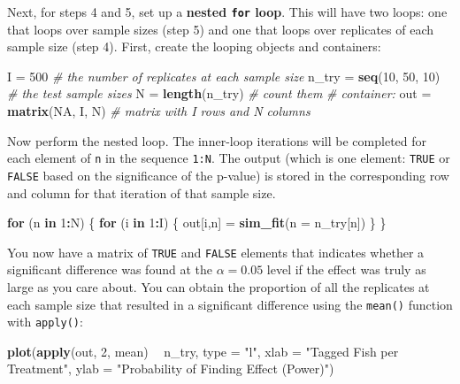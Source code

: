 \documentclass[]{book}
\newenvironment{Shaded}{\begin{snugshade}}{\end{snugshade}}
\newcommand{\KeywordTok}[1]{\textcolor[rgb]{0.13,0.29,0.53}{\textbf{#1}}}
\newcommand{\DataTypeTok}[1]{\textcolor[rgb]{0.13,0.29,0.53}{#1}}
\newcommand{\DecValTok}[1]{\textcolor[rgb]{0.00,0.00,0.81}{#1}}
\newcommand{\StringTok}[1]{\textcolor[rgb]{0.31,0.60,0.02}{#1}}
\newcommand{\CommentTok}[1]{\textcolor[rgb]{0.56,0.35,0.01}{\textit{#1}}}
\newcommand{\OtherTok}[1]{\textcolor[rgb]{0.56,0.35,0.01}{#1}}
\newcommand{\ControlFlowTok}[1]{\textcolor[rgb]{0.13,0.29,0.53}{\textbf{#1}}}
\newcommand{\OperatorTok}[1]{\textcolor[rgb]{0.81,0.36,0.00}{\textbf{#1}}}
\newcommand{\NormalTok}[1]{#1}
\theoremstyle{definition}
\theoremstyle{definition}
\theoremstyle{definition}
\theoremstyle{remark}
\begin{document}
Next, for steps 4 and 5, set up a \textbf{nested \texttt{for} loop}.
This will have two loops: one that loops over sample sizes (step 5) and
one that loops over replicates of each sample size (step 4). First,
create the looping objects and containers:

\begin{Shaded}
\begin{Highlighting}[]
\NormalTok{I =}\StringTok{ }\DecValTok{500}  \CommentTok{# the number of replicates at each sample size}
\NormalTok{n_try =}\StringTok{ }\KeywordTok{seq}\NormalTok{(}\DecValTok{10}\NormalTok{, }\DecValTok{50}\NormalTok{, }\DecValTok{10}\NormalTok{)  }\CommentTok{# the test sample sizes}
\NormalTok{N =}\StringTok{ }\KeywordTok{length}\NormalTok{(n_try)        }\CommentTok{# count them}
\CommentTok{# container: }
\NormalTok{out =}\StringTok{ }\KeywordTok{matrix}\NormalTok{(}\OtherTok{NA}\NormalTok{, I, N) }\CommentTok{# matrix with I rows and N columns}
\end{Highlighting}
\end{Shaded}

Now perform the nested loop. The inner-loop iterations will be completed
for each element of \texttt{n} in the sequence \texttt{1:N}. The output
(which is one element: \texttt{TRUE} or \texttt{FALSE} based on the
significance of the p-value) is stored in the corresponding row and
column for that iteration of that sample size.

\begin{Shaded}
\begin{Highlighting}[]
\ControlFlowTok{for}\NormalTok{ (n }\ControlFlowTok{in} \DecValTok{1}\OperatorTok{:}\NormalTok{N) \{}
  \ControlFlowTok{for}\NormalTok{ (i }\ControlFlowTok{in} \DecValTok{1}\OperatorTok{:}\NormalTok{I) \{}
\NormalTok{    out[i,n] =}\StringTok{ }\KeywordTok{sim_fit}\NormalTok{(}\DataTypeTok{n =}\NormalTok{ n_try[n])}
\NormalTok{  \}}
\NormalTok{\}}
\end{Highlighting}
\end{Shaded}

You now have a matrix of \texttt{TRUE} and \texttt{FALSE} elements that
indicates whether a significant difference was found at the
\(\alpha = 0.05\) level if the effect was truly as large as you care
about. You can obtain the proportion of all the replicates at each
sample size that resulted in a significant difference using the
\texttt{mean()} function with \texttt{apply()}:

\begin{Shaded}
\begin{Highlighting}[]
\KeywordTok{plot}\NormalTok{(}\KeywordTok{apply}\NormalTok{(out, }\DecValTok{2}\NormalTok{, mean) }\OperatorTok{~}\StringTok{ }\NormalTok{n_try, }\DataTypeTok{type =} \StringTok{"l"}\NormalTok{,}
     \DataTypeTok{xlab =} \StringTok{"Tagged Fish per Treatment"}\NormalTok{,}
     \DataTypeTok{ylab =} \StringTok{"Probability of Finding Effect (Power)"}\NormalTok{)}
\end{Highlighting}
\end{Shaded}
\end{document}
